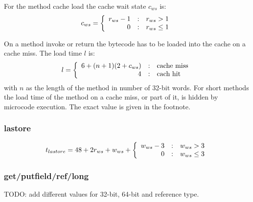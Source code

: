 For the method cache load the cache wait state $c_{ws}$ is:
\begin{equation*}
    c_{ws} =
    \left\{\begin{array}{r@{\quad:\quad}l}
    r_{ws}-1 & r_{ws}>1 \\
    0   & r_{ws}\le1
    \end{array} \right.
\end{equation*}

On a method invoke or return the bytecode has to be loaded into the
cache on a cache miss. The load time $l$ is:
\[
    l =
    \left\{\begin{array}{r@{\quad:\quad}l}
    6+(n+1)(2+c_{ws}) & \mbox{cache miss} \\
    4   & \mbox{cach hit}
    \end{array} \right.
\]
with $n$ as the length of the method in number of 32-bit words. For
short methods the load time of the method on a cache miss, or part
of it, is hidden by microcode execution. The exact value is given in
the footnote.

%

\subsubsection*{lastore}

\begin{equation*}
    t_{lastore} = 48+2r_{ws}+w_{ws} + \left\{\begin{array}{r@{\quad:\quad}l}
    w_{ws}-3 & w_{ws}>3 \\
    0   & w_{ws}\le3
    \end{array} \right.
\end{equation*}

\subsubsection*{get/putfield/ref/long}

TODO: add different values for 32-bit, 64-bit and reference type.

%
